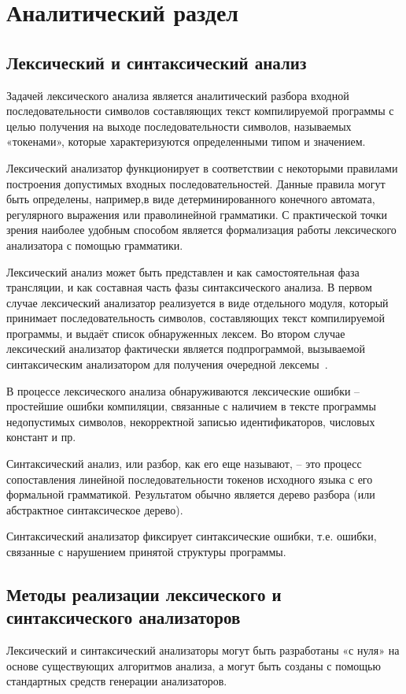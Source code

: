 \section{Аналитический раздел}\label{sec:analytic}

\subsection{Лексический и синтаксический анализ}\label{subsec:lexical_syntax}
Задачей лексического анализа является аналитический разбора входной последовательности символов составляющих текст
компилируемой программы с целью получения на выходе последовательности символов, называемых «токенами», которые
характеризуются определенными типом и значением.

Лексический анализатор функционирует в соответствии с некоторыми правилами построения допустимых входных последовательностей.
Данные правила могут быть определены, например,в виде детерминированного конечного автомата, регулярного выражения или праволинейной грамматики.
С практической точки зрения наиболее удобным способом является формализация работы лексического анализатора с помощью грамматики.

Лексический анализ может быть представлен и как самостоятельная фаза трансляции, и как составная часть фазы синтаксического анализа.
В первом случае лексический анализатор реализуется в виде отдельного модуля, который принимает последовательность символов, составляющих
текст компилируемой программы, и выдаёт список обнаруженных лексем.
Во втором случае лексический анализатор фактически является подпрограммой, вызываемой синтаксическим анализатором для получения
очередной лексемы~\cite{based}.

В процессе лексического анализа обнаруживаются лексические ошибки – простейшие ошибки компиляции, связанные с наличием
в тексте программы недопустимых символов, некорректной записью идентификаторов, числовых констант и пр.

Синтаксический анализ, или разбор, как его еще называют, – это процесс сопоставления линейной последовательности
токенов исходного языка с его формальной грамматикой.
Результатом обычно является дерево разбора (или абстрактное синтаксическое дерево).

Синтаксический анализатор фиксирует синтаксические ошибки, т.е. ошибки, связанные с нарушением принятой структуры программы.

\subsection{Методы реализации лексического и синтаксического анализаторов}\label{subsec:methods}
Лексический и синтаксический анализаторы могут быть разработаны «с нуля» на основе существующих алгоритмов анализа,
а могут быть созданы с помощью стандартных средств генерации анализаторов.

